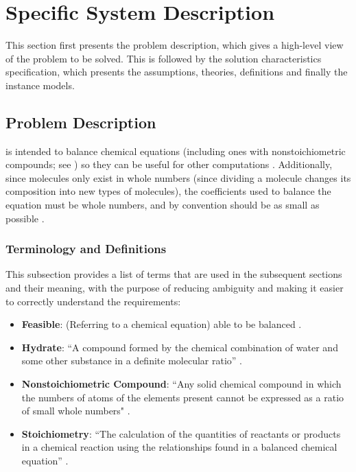 \documentclass[12pt]{article}
\begin{document}
\section{Specific System Description} \label{sec_specSysDesc}

This section first presents the problem description, which gives a high-level
view of the problem to be solved.  This is followed by the solution characteristics
specification, which presents the assumptions, theories, definitions and finally
the instance models.

\subsection{Problem Description} \label{sec_probDesc}

\progname{} is intended to balance chemical equations (including ones with
nonstoichiometric compounds; see ) so
they can be useful for other computations \cite{lund_introduction_2023}.
Additionally, since molecules only exist in whole numbers (since dividing a
molecule changes its composition into new types of molecules), the coefficients
used to balance the equation must be whole
numbers, and by convention should be as small as possible
\cite{lund_introduction_2023}.

\subsubsection{Terminology and  Definitions} \label{sec_termsDefs}
This subsection provides a list of terms that are used in the subsequent
sections and their meaning, with the purpose of reducing ambiguity and making it
easier to correctly understand the requirements:

\begin{itemize}
\item \textbf{Feasible}: (Referring to a chemical equation) able to be
balanced \cite{hamid_balancing_2019}.

\item \textbf{Hydrate}: ``A compound formed by the chemical combination of water
and some other substance in a definite molecular ratio''
\cite{harpercollins_publishers_hydrate_nodate}.

\item \textbf{Nonstoichiometric Compound}: ``Any solid chemical compound in
which the numbers of atoms of the elements present cannot be expressed as a
ratio of small whole numbers"
\cite{the_editors_of_encyclopaedia_britannica_nonstoichiometric_2010}.

\item \textbf{Stoichiometry}: ``The calculation of the quantities of reactants
or products in a chemical reaction using the relationships found in a balanced
chemical equation'' \cite[p. 337]{lund_introduction_2023}.

\end{itemize}
\end{document}
